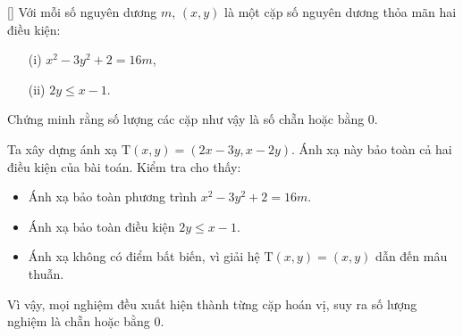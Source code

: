 \documentclass[../04-diophantine-equations.tex]{subfiles}
\begin{document}
\begin{example*}\label{example:KOR-2015-MO-P1}[\textbf{}]
	Với mỗi số nguyên dương \( m \), \( (x, y) \) là một cặp số nguyên dương thỏa mãn hai điều kiện:
	\begin{enumerate}[topsep=0pt, partopsep=0pt, itemsep=0pt]
		\item[(i)] \( x^2 - 3y^2 + 2 = 16m \),
		\item[(ii)] \( 2y \le x - 1 \).
	\end{enumerate}
	Chứng minh rằng số lượng các cặp như vậy là số chẵn hoặc bằng 0.
\end{example*}

\begin{story*}
    Ta xây dựng ánh xạ \( \mathrm{T}(x, y) = (2x - 3y, x - 2y) \). Ánh xạ này bảo toàn cả hai điều kiện của bài toán.  
    Kiểm tra cho thấy:
    \begin{itemize}[topsep=0pt, partopsep=0pt, itemsep=0pt]
        \item Ánh xạ bảo toàn phương trình \( x^2 - 3y^2 + 2 = 16m \).
        \item Ánh xạ bảo toàn điều kiện \( 2y \le x - 1 \).
        \item Ánh xạ không có điểm bất biến, vì giải hệ \( \mathrm{T}(x, y) = (x, y) \) dẫn đến mâu thuẫn.
    \end{itemize}
    Vì vậy, mọi nghiệm đều xuất hiện thành từng cặp hoán vị, suy ra số lượng nghiệm là chẵn hoặc bằng 0.
\end{story*}

\bigbreak
\end{document}
